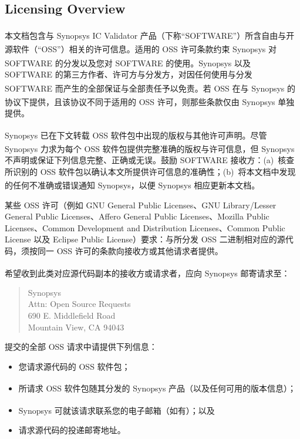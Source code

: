 \subsection*{Licensing Overview}

本文档包含与 Synopsys\textsuperscript{\textregistered} IC Validator 产品（下称``SOFTWARE''）所含自由与开源软件（``OSS''）相关的许可信息。适用的 OSS 许可条款约束 Synopsys\textsuperscript{\textregistered} 对 SOFTWARE 的分发以及您对 SOFTWARE 的使用。Synopsys\textsuperscript{\textregistered} 以及 SOFTWARE 的第三方作者、许可方与分发方，对因任何使用与分发 SOFTWARE 而产生的全部保证与全部责任予以免责。若 OSS 在与 Synopsys\textsuperscript{\textregistered} 的协议下提供，且该协议不同于适用的 OSS 许可，则那些条款仅由 Synopsys\textsuperscript{\textregistered} 单独提供。

Synopsys\textsuperscript{\textregistered} 已在下文转载 OSS 软件包中出现的版权与其他许可声明。尽管 Synopsys\textsuperscript{\textregistered} 力求为每个 OSS 软件包提供完整准确的版权与许可信息，但 Synopsys\textsuperscript{\textregistered} 不声明或保证下列信息完整、正确或无误。鼓励 SOFTWARE 接收方：(a)~核查所识别的 OSS 软件包以确认本文所提供许可信息的准确性；(b)~将本文档中发现的任何不准确或错误通知 Synopsys\textsuperscript{\textregistered}，以便 Synopsys\textsuperscript{\textregistered} 相应更新本文档。

某些 OSS 许可（例如 GNU General Public Licenses、GNU Library/Lesser General Public Licenses、Affero General Public Licenses、Mozilla Public Licenses、Common Development and Distribution Licenses、Common Public License 以及 Eclipse Public License）要求：与所分发 OSS 二进制相对应的源代码，须按同一 OSS 许可的条款向接收方或其他请求者提供。

希望收到此类对应源代码副本的接收方或请求者，应向 Synopsys\textsuperscript{\textregistered} 邮寄请求至：
\begin{quote}
Synopsys\\
Attn: Open Source Requests\\
690 E. Middlefield Road\\
Mountain View, CA 94043
\end{quote}

提交的全部 OSS 请求中请提供下列信息：
\begin{itemize}
  \item 您请求源代码的 OSS 软件包；
  \item 所请求 OSS 软件包随其分发的 Synopsys\textsuperscript{\textregistered} 产品（以及任何可用的版本信息）；
  \item Synopsys\textsuperscript{\textregistered} 可就该请求联系您的电子邮箱（如有）；以及
  \item 请求源代码的投递邮寄地址。
\end{itemize}

